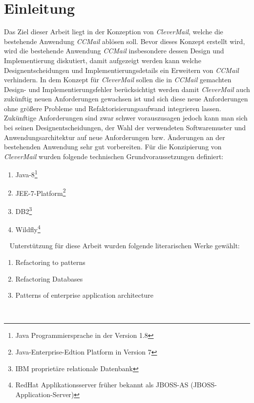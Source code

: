 \chapter{Einleitung}
\label{cha:einleitung}
Das Ziel dieser Arbeit liegt in der Konzeption von \emph{CleverMail}, welche die bestehende Anwendung \emph{CCMail} ablösen soll. Bevor dieses Konzept erstellt wird, wird die bestehende Anwendung \emph{CCMail} insbesondere dessen Design und Implementierung diskutiert, damit aufgezeigt werden kann welche Designentscheidungen und Implementierungsdetails ein Erweitern von \emph{CCMail} verhindern. In dem Konzept für \emph{CleverMail} sollen die in \emph{CCMail} gemachten Design- und Implementierungsfehler berücksichtigt werden damit \emph{CleverMail} auch zukünftig neuen Anforderungen gewachsen ist und sich diese neue Anforderungen ohne größere Probleme und Refaktorisierungsaufwand integrieren lassen. Zukünftige Anforderungen sind zwar schwer vorauszusagen jedoch kann man sich bei seinen Designentscheidungen, der Wahl der verwendeten Softwaremuster und Anwendungsarchitektur auf neue Anforderungen bzw. Änderungen an der bestehenden Anwendung sehr gut vorbereiten.
\newline
\newline
Für die Konzipierung von \emph{CleverMail} wurden folgende technischen Grundvoraussetzungen definiert:
\begin{enumerate}
	\item Java-8\footnote{Java Programmiersprache in der Version 1.8}
	\item JEE-7-Platform\footnote{Java-Enterprise-Edtion Platform in Version 7}
	\item DB2\footnote{IBM proprietäre relationale Datenbank}
	\item Wildfly\footnote{RedHat Applikationsserver früher bekannt als JBOSS-AS (JBOSS-Application-Server)}
\end{enumerate}
\ \newpage
{} Unterstützung für diese Arbeit wurden folgende literarischen Werke gewählt:
\begin{enumerate}
	\item Refactoring to patterns\cite{refactoreDatabase}
	\item Refactoring Databases\cite{refactoreToPatterns}
	\item Patterns of enterprise application architecture\cite{patternsOfEnterprise}
\end{enumerate}
\ \newline
